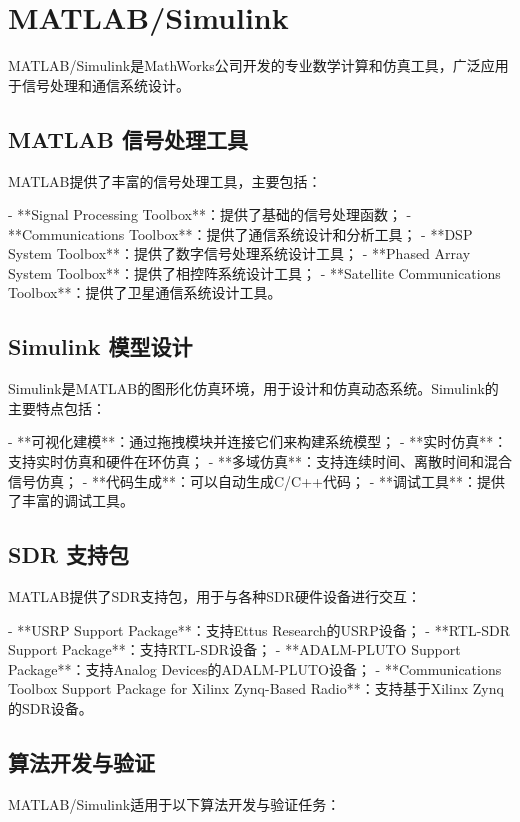 ﻿\documentclass[UTF8]{ctexbook}
\begin{document}
\section{MATLAB/Simulink}

MATLAB/Simulink是MathWorks公司开发的专业数学计算和仿真工具，广泛应用于信号处理和通信系统设计。

\subsection{MATLAB 信号处理工具}

MATLAB提供了丰富的信号处理工具，主要包括：

- **Signal Processing Toolbox**：提供了基础的信号处理函数；
- **Communications Toolbox**：提供了通信系统设计和分析工具；
- **DSP System Toolbox**：提供了数字信号处理系统设计工具；
- **Phased Array System Toolbox**：提供了相控阵系统设计工具；
- **Satellite Communications Toolbox**：提供了卫星通信系统设计工具。

\subsection{Simulink 模型设计}

Simulink是MATLAB的图形化仿真环境，用于设计和仿真动态系统。Simulink的主要特点包括：

- **可视化建模**：通过拖拽模块并连接它们来构建系统模型；
- **实时仿真**：支持实时仿真和硬件在环仿真；
- **多域仿真**：支持连续时间、离散时间和混合信号仿真；
- **代码生成**：可以自动生成C/C++代码；
- **调试工具**：提供了丰富的调试工具。

\subsection{SDR 支持包}

MATLAB提供了SDR支持包，用于与各种SDR硬件设备进行交互：

- **USRP Support Package**：支持Ettus Research的USRP设备；
- **RTL-SDR Support Package**：支持RTL-SDR设备；
- **ADALM-PLUTO Support Package**：支持Analog Devices的ADALM-PLUTO设备；
- **Communications Toolbox Support Package for Xilinx Zynq-Based Radio**：支持基于Xilinx Zynq的SDR设备。

\subsection{算法开发与验证}

MATLAB/Simulink适用于以下算法开发与验证任务：
\end{document}
